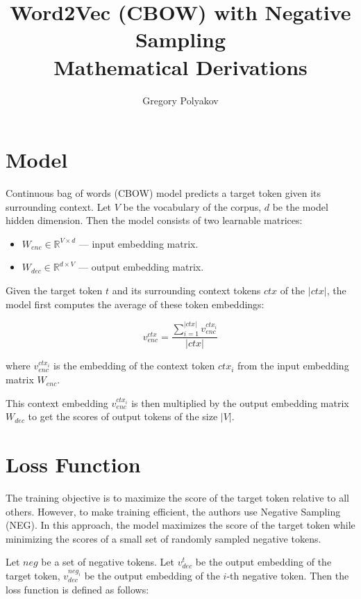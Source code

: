 \documentclass[11pt]{article}
\title{Word2Vec (CBOW) with Negative Sampling\\ Mathematical Derivations}
\author{Gregory Polyakov}
\date{}
\begin{document}
\maketitle

\section{Model}

Continuous bag of words (CBOW) model predicts a target token given its surrounding context. Let $V$ be the vocabulary of the corpus, $d$ be the model hidden dimension. Then the model consists of two learnable matrices:

\begin{itemize}
    \item $W_{enc} \in \mathbb{R}^{V \times d}$ — input embedding matrix.
    \item $W_{dec} \in \mathbb{R}^{d \times V}$ — output embedding matrix.
\end{itemize}

Given the target token $t$ and its surrounding context tokens $ctx$ of the $|ctx|$, the model first computes the average of these token embeddings:

\begin{equation}
    v^{ctx}_{enc} = \frac{\sum_{i = 1}^{|ctx|} v^{ctx_i}_{enc}}{|ctx|}
\end{equation}

where $v^{ctx_i}_{enc}$ is the embedding of the context token $ctx_i$ from the input embedding matrix $W_{enc}$.

This context embedding $v^{ctx_i}_{enc}$ is then multiplied by the output embedding matrix $W_{dec}$ to get the scores of output tokens of the size $|V|$. 

\section{Loss Function}

The training objective is to maximize the score of the target token relative to all others. However, to make training efficient, the authors use Negative Sampling (NEG). In this approach, the model maximizes the score of the target token while minimizing the scores of a small set of randomly sampled negative tokens.

Let $neg$ be a set of negative tokens. Let $v^t_{dec}$ be the output embedding of the target token, $v^{neg_i}_{dec}$ be the output embedding of the $i$-th negative token. Then the loss function is defined as follows:
\end{document}
